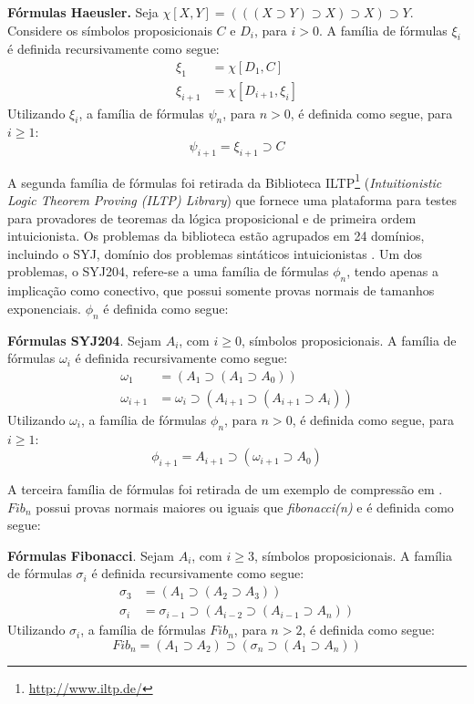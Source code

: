 \begin{definition}{\textbf{Fórmulas Haeusler.}}
Seja $\chi[X, Y] = (((X \supset Y) \supset X) \supset X) \supset Y$. Considere os símbolos proposicionais $C$ e $D_i$, para $i > 0$. A família de fórmulas $\xi_{i}$ é definida recursivamente como segue:
\begin{align*}
\xi_1 &= \chi[D_1, C] \\
\xi_{i+1} &= \chi[D_{i+1}, \xi_i]
\end{align*}
Utilizando $\xi_i$, a família de fórmulas $\psi_n$, para $n > 0$, é definida como segue, para $i \geq 1$: $$\psi_{i+1} = \xi_{i+1} \supset C$$
\end{definition}

A segunda família de fórmulas foi retirada da Biblioteca ILTP\footnote{\href{http://www.iltp.de/}{http://www.iltp.de/}} (\textit{Intuitionistic Logic Theorem Proving (ILTP) Library}) que fornece uma plataforma para testes para provadores de teoremas da lógica proposicional e de primeira ordem intuicionista. Os problemas da biblioteca estão agrupados em 24 domínios, incluindo o SYJ, domínio dos problemas sintáticos intuicionistas \cite{raths2007iltp}. Um dos problemas, o SYJ204, refere-se a uma família de fórmulas $\phi_n$, tendo apenas a implicação como conectivo, que possui somente provas normais de tamanhos exponenciais. $\phi_n$ é definida como segue:

\begin{definition}{\textbf{Fórmulas SYJ204}.}
Sejam $A_i$, com $i \geq 0$, símbolos proposicionais. A família de fórmulas $\omega_i$ é definida recursivamente como segue:
\begin{align*}
\omega_1 &= (A_1 \supset (A_1 \supset A_0)) \\
\omega_{i+1} &= \omega_i \supset (A_{i+1} \supset (A_{i+1} \supset A_i))
\end{align*}
Utilizando $\omega_i$, a família de fórmulas $\phi_n$, para $n > 0$, é definida como segue, para $i \geq 1$: $$\phi_{i+1} = A_{i+1} \supset (\omega_{i+1} \supset A_0)$$
\end{definition}

A terceira família de fórmulas foi retirada de um exemplo de compressão em \cite{GordeevH16}. $Fib_n$ possui provas normais maiores ou iguais que \textit{fibonacci(n)} e é definida como segue:

\begin{definition}{\textbf{Fórmulas Fibonacci}.}
Sejam $A_i$, com $i \geq 3$, símbolos proposicionais. A família de fórmulas $\sigma_i$ é definida recursivamente como segue:
\begin{align*}
\sigma_3 &= (A_{1} \supset (A_{2} \supset A_{3})) \\
\sigma_{i} &= \sigma_{i-1} \supset (A_{i-2} \supset (A_{i-1} \supset A_{n}))
\end{align*}
Utilizando $\sigma_i$, a família de fórmulas $Fib_n$, para $n > 2$, é definida como segue: $$Fib_{n} = (A_{1} \supset A_2) \supset (\sigma_{n} \supset (A_1 \supset A_n))$$
\end{definition}


